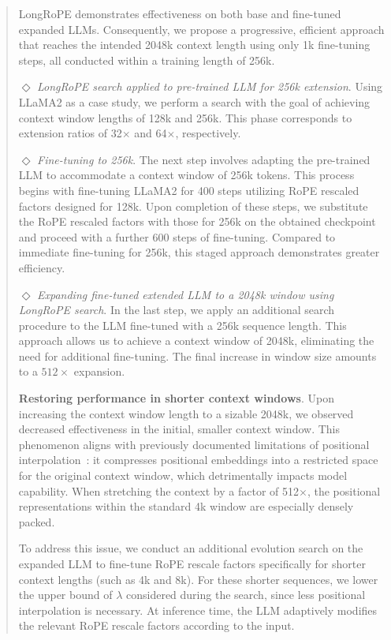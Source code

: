 \begin{abstract}
LongRoPE demonstrates effectiveness on both base and fine-tuned expanded LLMs. Consequently, we propose a progressive, efficient approach that reaches the intended 2048k context length using only 1k fine-tuning steps, all conducted within a training length of 256k.

$\Diamond$ \textit{LongRoPE search applied to pre-trained LLM for 256k extension}. Using LLaMA2 as a case study, we perform a search with the goal of achieving context window lengths of 128k and 256k. This phase corresponds to extension ratios of 32$\times$ and 64$\times$, respectively.

$\Diamond$ \textit{Fine-tuning to 256k}. The next step involves adapting the pre-trained LLM to accommodate a context window of 256k tokens. This process begins with fine-tuning LLaMA2 for 400 steps utilizing RoPE rescaled factors designed for 128k. Upon completion of these steps, we substitute the RoPE rescaled factors with those for 256k on the obtained checkpoint and proceed with a further 600 steps of fine-tuning. Compared to immediate fine-tuning for 256k, this staged approach demonstrates greater efficiency.

$\Diamond$ \textit{Expanding fine-tuned extended LLM to a 2048k window using LongRoPE search}. In the last step, we apply an additional search procedure to the LLM fine-tuned with a 256k sequence length. This approach allows us to achieve a context window of 2048k, eliminating the need for additional fine-tuning. The final increase in window size amounts to a $512\times$ expansion.

\textbf{Restoring performance in shorter context windows}. Upon increasing the context window length to a sizable 2048k, we observed decreased effectiveness in the initial, smaller context window. This phenomenon aligns with previously documented limitations of positional interpolation~\cite{pi}: it compresses positional embeddings into a restricted space for the original context window, which detrimentally impacts model capability. When stretching the context by a factor of 512$\times$, the positional representations within the standard 4k window are especially densely packed.

To address this issue, we conduct an additional evolution search on the expanded LLM to fine-tune RoPE rescale factors specifically for shorter context lengths (such as 4k and 8k). For these shorter sequences, we lower the upper bound of $\lambda$ considered during the search, since less positional interpolation is necessary. At inference time, the LLM adaptively modifies the relevant RoPE rescale factors according to the input.


\end{abstract}
